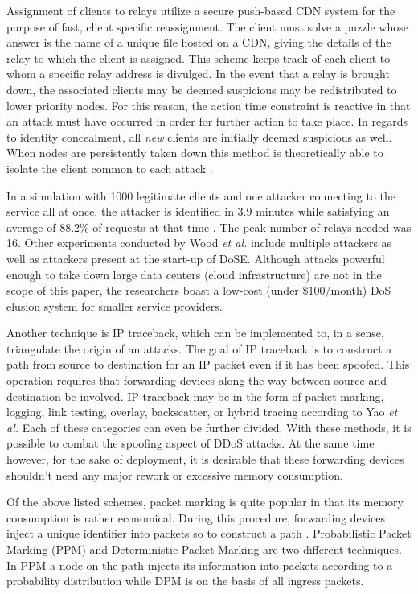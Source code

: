\documentclass[conference]{IEEEtran}
\begin{document}
Assignment of clients to relays utilize a secure push-based CDN system for the purpose of fast, client specific reassignment. The client must solve a puzzle whose answer is the name of a unique file hosted on a CDN, giving the details of the relay to which the client is assigned. This scheme keeps track of each client to whom a specific relay address is divulged. In the event that a relay is brought down, the associated clients may be deemed suspicious may be redistributed to lower priority nodes. For this reason, the action time constraint is reactive in that an attack must have occurred in order for further action to take place. In regards to identity concealment, all \textit{new} clients are initially deemed suspicious as well. When nodes are persistently taken down this method is theoretically able to isolate the client common to each attack \cite{Wood:DoSE}.

In a simulation with 1000 legitimate clients and one attacker connecting to the service all at once, the attacker is identified in 3.9 minutes while satisfying an average of 88.2\% of requests at that time \cite{Wood:DoSE}. The peak number of relays needed was 16. Other experiments conducted by Wood \textit{et al.} include multiple attackers as well as attackers present at the start-up of DoSE. Although attacks powerful enough to take down large data centers (cloud infrastructure) are not in the scope of this paper, the researchers boast a low-cost (under \$100/month) DoS elusion system for smaller service providers.


Another technique is IP traceback, which can be implemented to, in a sense, triangulate the origin of an attacks. The goal of IP traceback is to construct a path from source to destination for an IP packet even if it has been spoofed. This operation requires that forwarding devices along the way between source and destination be involved. IP traceback may be in the form of packet marking, logging, link testing, overlay, backscatter, or hybrid tracing according to Yao \textit{et al.} Each of these categories can even be further divided. With these methods, it is possible to combat the spoofing aspect of DDoS attacks. At the same time however, for the sake of deployment, it is desirable that these forwarding devices shouldn’t need any major rework or excessive memory consumption.

Of the above listed schemes, packet marking is quite popular in that its memory consumption is rather economical. During this procedure, forwarding devices inject a unique identifier into packets so to construct a path \cite{Yao:IPTraceback}. Probabilistic Packet Marking (PPM) and Deterministic Packet Marking are two different techniques. In PPM a node on the path injects its information into packets according to a probability distribution while DPM is on the basis of all ingress packets.
\end{document}
